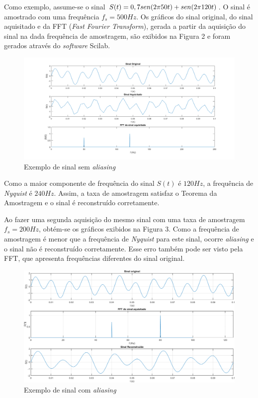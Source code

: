 \documentclass[11pt]{abntex2}
\begin{document}
			Como exemplo, assume-se o sinal $S(t) = 0,7\*sen(2\*\pi\*50\*t) +
			sen(2\*\pi\*120\*t)$. O sinal é amostrado com uma frequência $f_s =
			500Hz$. Os gráficos do sinal original, do sinal aquisitado e da FFT
			(\textit{Fast Fourier Transform}), gerada a partir da aquisição do
			sinal na dada frequência de amostragem, são exibidos na Figura 2 e
			foram gerados através do \textit{software} Scilab.

			\begin{figure}[H]
				\centering
				\includegraphics[width=\linewidth]{../Fotos/aliasingFs500.png}
				\caption{Exemplo de sinal sem \textit{aliasing}}
			\end{figure}

			Como a maior componente de frequência do sinal $S(t)$ é $120Hz$, a
			frequência de \textit{Nyquist} é $240Hz$. Assim, a taxa de amostragem satisfaz
			o Teorema da Amostragem e o sinal é reconstruído corretamente.

			Ao fazer uma segunda aquisição do mesmo sinal com uma taxa de
			amostragem $f_s = 200Hz$, obtém-se os gráficos exibidos na Figura 3.
			Como a frequência de amostragem é menor que a frequência de
			\textit{Nyquist} para este sinal, ocorre \textit{aliasing} e o sinal não é
			reconstruído corretamente. Esse erro também pode ser visto pela FFT,
			que apresenta frequências diferentes do sinal original.

			\begin{figure}[H]
				\centering
				\includegraphics[width=\linewidth]{../Fotos/aliasingFs200.png}
				\caption{Exemplo de sinal com \textit{aliasing}}
			\end{figure}
\end{document}
